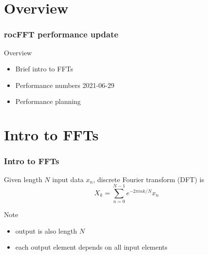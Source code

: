 \documentclass[10pt,aspectratio=169]{beamer}
\title{\thetitle{}}
\subtitle{\thesubtitle{}}
\author{\theauthor{}}
\institute{\theauthorinstitute}
\begin{document}
\klavikumfont
{}

{
  \begin{frame}
    \titlepage
  \end{frame}
}


\section{Overview}

\begin{frame}
  \frametitle{rocFFT performance update}

  Overview
  \begin{itemize}
  \item Brief intro to FFTs
  \item Performance numbers 2021-06-29 \hyperlink{perf01}{}
  \item Performance planning
  \end{itemize}
\end{frame}

\section{Intro to FFTs}

\begin{frame}
  \frametitle{Intro to FFTs}

  Given length $N$ input data $x_n$, discrete Fourier transform (DFT) is
  \begin{equation*}
    X_k = \sum_{n=0}^{N-1} e^{-2 \pi i n k / N} x_n
  \end{equation*}

  Note
  \begin{itemize}
  \item output is also length $N$
  \item each output element depends on all input elements
  \end{itemize}
\end{frame}
\end{document}
